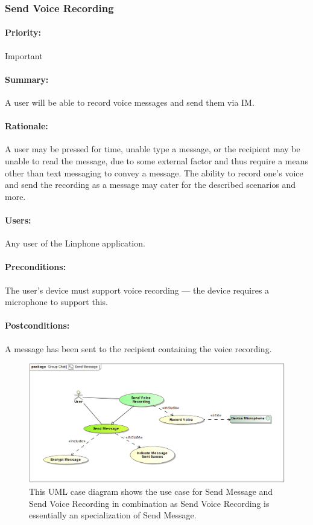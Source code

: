 \documentclass[11pt]{article}
\begin{document}
\subsubsection{Send Voice Recording} \label{UC-send-voice}
\paragraph{Priority:} Important
\paragraph{Summary:} A user will be able to record voice messages and send them via IM.
\paragraph{Rationale:} A user may be pressed for time, unable type a message, or the recipient may be unable to read the message, due to some external factor and thus require a means other than text messaging to convey a message. The ability to record one's voice and send the recording as a message may cater for the described scenarios and more.
\paragraph{Users:} Any user of the Linphone application.
\paragraph{Preconditions:} The user's device must support voice recording --- the device requires a microphone to support this.
\paragraph{{Postconditions:}} A message has been sent to the recipient containing the voice recording.
\begin{figure}[H]
\centering
\includegraphics[width=5in]{./images/send_message_UC.png}
\caption[Send Message Use Case]{This UML case diagram shows the use case for Send Message and Send Voice Recording in combination as Send Voice Recording is essentially an specialization of Send Message.}
\label{UC-figure-send-message}
\end{figure}
\end{document}
